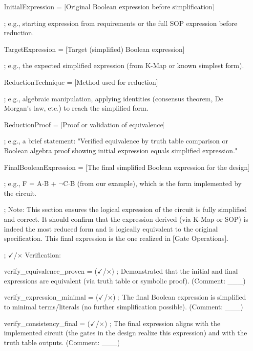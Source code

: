 \documentclass[11pt]{article}
\begin{document}
\vspace{0.5em}


\noindent InitialExpression = [Original Boolean expression before simplification]

\noindent ; e.g., starting expression from requirements or the full SOP expression before reduction.

\noindent TargetExpression = [Target (simplified) Boolean expression]

\noindent ; e.g., the expected simplified expression (from K-Map or known simplest form).

\noindent ReductionTechnique = [Method used for reduction]

\noindent ; e.g., algebraic manipulation, applying identities (consensus theorem, De Morgan's law, etc.) to reach the simplified form.

\noindent ReductionProof = [Proof or validation of equivalence]

\noindent ; e.g., a brief statement: "Verified equivalence by truth table comparison or Boolean algebra proof showing initial expression equals simplified expression."

\noindent FinalBooleanExpression = [The final simplified Boolean expression for the design]

\noindent ; e.g., F = A$\cdot$B + $\lnot$C$\cdot$B (from our example), which is the form implemented by the circuit.

\noindent ; Note: This section ensures the logical expression of the circuit is fully simplified and correct. It should confirm that the expression derived (via K-Map or SOP) is indeed the most reduced form and is logically equivalent to the original specification. This final expression is the one realized in [Gate Operations].

\vspace{0.5em}

\noindent ; $\checkmark$/$\times$ Verification:

\noindent verify\_equivalence\_proven = ($\checkmark$/$\times$) ; Demonstrated that the initial and final expressions are equivalent (via truth table or symbolic proof). (Comment: \_\_\_)

\noindent verify\_expression\_minimal = ($\checkmark$/$\times$) ; The final Boolean expression is simplified to minimal terms/literals (no further simplification possible). (Comment: \_\_\_)

\noindent verify\_consistency\_final = ($\checkmark$/$\times$) ; The final expression aligns with the implemented circuit (the gates in the design realize this expression) and with the truth table outputs. (Comment: \_\_\_)
\end{document}
